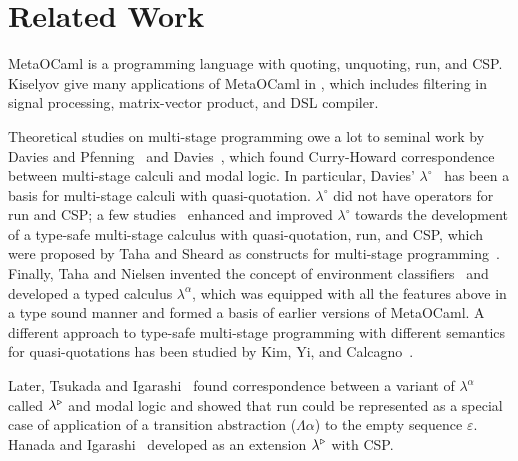 
\section{Related Work \label{sec:related-work}}

MetaOCaml is a programming language with quoting, unquoting, run, and
CSP.  Kiselyov give many applications of MetaOCaml in \cite{8384206},
which includes filtering in signal processing, matrix-vector product,
and DSL compiler.  


Theoretical studies on multi-stage programming owe a lot to seminal
work by Davies and Pfenning~\cite{DaviesPfenning01JACM} and
Davies~\cite{davies1996temporal}, which found Curry-Howard
correspondence between multi-stage calculi and modal logic.  In
particular, Davies' $\lambda^\circ$~\cite{davies1996temporal} has been
a basis for multi-stage calculi with quasi-quotation.  $\lambda^\circ$
did not have operators for run and CSP; a few
studies~\cite{benaissa1999logical,MoggiTahaBenaissaSheard99ESOP}
enhanced and improved $\lambda^\circ$ towards the development of a
type-safe multi-stage calculus with quasi-quotation, run, and CSP,
which were proposed by Taha and Sheard as constructs for multi-stage
programming~\cite{MetaML}.
Finally, Taha and Nielsen invented the concept of environment
classifiers~\cite{taha2003environment} and developed a typed calculus
$\lambda^\alpha$, which was equipped with all the features above in a
type sound manner and formed a basis of earlier versions of MetaOCaml.
A different approach to type-safe multi-stage programming with
different semantics for quasi-quotations has been studied by Kim, Yi,
and Calcagno~\cite{DBLP:conf/popl/KimYC06}.

Later, Tsukada and Igarashi~\cite{Tsukada} found correspondence
between a variant of \(\lambda^\alpha\) called $\lambda^{\mathop{\triangleright}}$
and modal logic and showed that run could be represented as a special
case of application of a transition abstraction ($\Lambda\alpha$) to
the empty sequence $\varepsilon$.  Hanada and
Igarashi~\cite{Hanada2014} developed \LTP as an extension
$\lambda^{\mathop{\triangleright}}$ with CSP.

